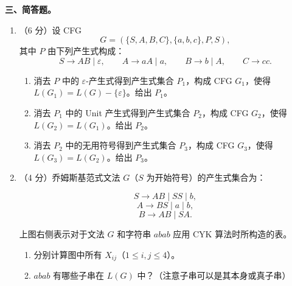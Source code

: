 \documentclass[UTF8,zihao=5]{ctexart}
\newcommand{\examheading}[1]{\par\medskip\noindent\textbf{#1。}\par}
\begin{document}
\examheading{三、简答题}

\begin{enumerate}[start=15]
  \item （6 分）设 CFG
  \[
    G=(\{S,A,B,C\},\{a,b,c\},P,S),
  \]
  其中 $P$ 由下列产生式构成：
  \[
    S\to AB\mid \varepsilon,\qquad
    A\to aA\mid a,\qquad
    B\to b\mid A,\qquad
    C\to cc.
  \]
  \begin{enumerate}[label=(\arabic*)]
    \item 消去 $P$ 中的 $\varepsilon$-产生式得到产生式集合 $P_1$，构成 CFG $G_1$，使得 $L(G_1)=L(G)-\{\varepsilon\}$。给出 $P_1$。
    \item 消去 $P_1$ 中的 Unit 产生式得到产生式集合 $P_2$，构成 CFG $G_2$，使得 $L(G_2)=L(G_1)$。给出 $P_2$。
    \item 消去 $P_2$ 中的无用符号得到产生式集合 $P_3$，构成 CFG $G_3$，使得 $L(G_3)=L(G_2)$。给出 $P_3$。
  \end{enumerate}

  \item （4 分）乔姆斯基范式文法 $G$（$S$ 为开始符号）的产生式集合为：

  \begin{minipage}[t]{0.53\linewidth}
  \[
    S\to AB\mid SS\mid b,
  \]
  \[
    A\to BS\mid a\mid b,
  \]
  \[
    B\to AB\mid SA.
  \]
  \end{minipage}\hfill
  \begin{minipage}[t]{0.34\linewidth}
  \vspace{-1.5em}
  \begin{center}
  \end{center}
  \end{minipage}

  上图右侧表示对于文法 $G$ 和字符串 $abab$ 应用 CYK 算法时所构造的表。
  \begin{enumerate}[label=(\arabic*)]
    \item 分别计算图中所有 $X_{ij}$（$1\le i,j\le 4$）。
    \item $abab$ 有哪些子串在 $L(G)$ 中？（注意子串可以是其本身或真子串）
  \end{enumerate}


\end{enumerate}
\end{document}
